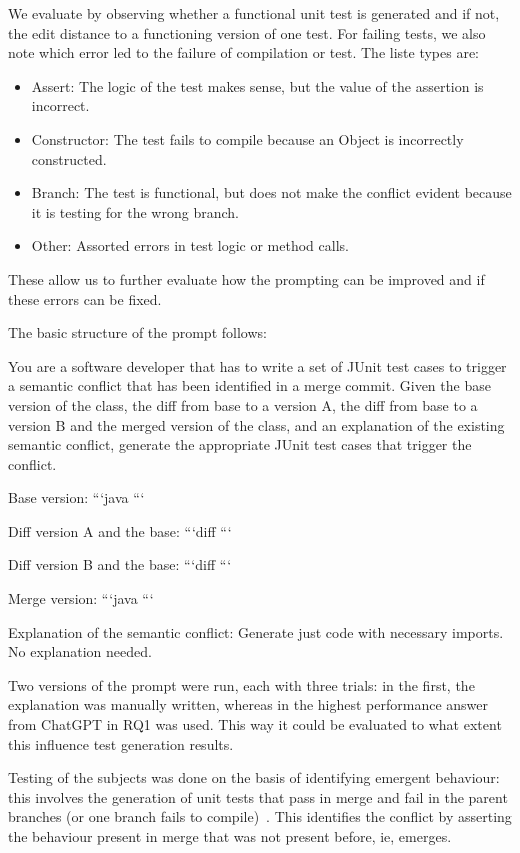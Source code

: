 We evaluate by observing whether a functional unit test is generated and if not, the edit distance to a functioning version of one test. For failing tests, we also note which error led to the failure of compilation or test. The liste types are:
\begin{itemize}
  \item Assert: The logic of the test makes sense, but the value of the assertion is incorrect.
  \item Constructor: The test fails to compile because an Object is incorrectly constructed.
  \item Branch: The test is functional, but does not make the conflict evident because it is testing for the wrong branch.
  \item Other: Assorted errors in test logic or method calls.
\end{itemize}
These allow us to further evaluate how the prompting can be improved and if these errors can be fixed.

The basic structure of the prompt follows:
\begin{prompt}
You are a software developer that has to write a set of JUnit test cases to trigger a semantic conflict that has been identified in a merge commit. 
Given the base version of the class, the diff from base to a version A, the diff from base to a version B and the merged version of the class, and an explanation of the existing semantic conflict, generate the appropriate JUnit test cases that trigger the conflict.

Base version:
```java
```

Diff version A and the base:
```diff
```

Diff version B and the base:
```diff
```

Merge version:
```java
```

Explanation of the semantic conflict:
Generate just code with necessary imports. No explanation needed.  
\end{prompt}
Two versions of the prompt were run, each with three trials: in the first, the explanation was manually written, whereas in the highest performance answer from ChatGPT in RQ1 was used.
This way it could be evaluated to what extent this influence test generation results.

Testing of the subjects was done on the basis of identifying emergent behaviour: this involves the generation of unit tests that 
pass in merge and fail in the parent branches (or one branch fails to compile)~\citet{kn:nuno}. This identifies the conflict by
asserting the behaviour present in merge that was not present before, ie, emerges.

